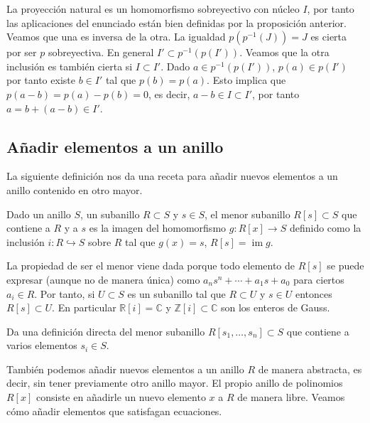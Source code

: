 
La proyección natural es un homomorfismo sobreyectivo con núcleo \(I\),
por tanto las aplicaciones del enunciado están bien definidas por la
proposición anterior. Veamos que una es inversa de la otra. La igualdad
\(p(p^{-1}(J))=J\) es cierta por ser \(p\) sobreyectiva. En general
\(I'\subset p^{-1}(p(I'))\). Veamos que la otra inclusión es también
cierta si \(I\subset I'\). Dado \(a\in p^{-1}(p(I'))\),
\(p(a)\in p(I')\) por tanto existe \(b\in I'\) tal que \(p(b)=p(a)\).
Esto implica que \(p(a-b)=p(a)-p(b)=0\), es decir,
\(a-b\in I\subset I'\), por tanto \(a=b+(a-b)\in I'\). 

\hypertarget{auxf1adir-elementos-a-un-anillo}{%
\subsection{Añadir elementos a un
anillo}\label{auxf1adir-elementos-a-un-anillo}}

La siguiente definición nos da una receta para añadir nuevos elementos a
un anillo contenido en otro mayor.


Dado un anillo \(S\), un subanillo \(R\subset S\) y \(s\in S\), el menor
subanillo \(R[s]\subset S\) que contiene a \(R\) y a \(s\) es la imagen
del homomorfismo \(g\colon R[x]\rightarrow S\) definido como la
inclusión \(i\colon R\hookrightarrow S\) sobre \(R\) tal que \(g(x)=s\),
\(R[s]=\operatorname{im} g\). 


La propiedad de ser el menor viene dada porque todo elemento de \(R[s]\)
se puede expresar (aunque no de manera única) como
\(a_ns^n+\cdots+a_1s+a_0\) para ciertos \(a_i\in R\). Por tanto, si
\(U\subset S\) es un subanillo tal que \(R\subset U\) y \(s\in U\)
entonces \(R[s]\subset U\). En particular \(\mathbb R[i]=\mathbb C\) y
\(\mathbb Z[i]\subset\mathbb C\) son los enteros de Gauss. 


Da una definición directa del menor subanillo
\(R[s_1,\dots,s_n]\subset S\) que contiene a varios elementos
\(s_i\in S\). 

También podemos añadir nuevos elementos a un anillo \(R\) de manera
abstracta, es decir, sin tener previamente otro anillo mayor. El propio
anillo de polinomios \(R[x]\) consiste en añadirle un nuevo elemento
\(x\) a \(R\) de manera libre. Veamos cómo añadir elementos que
satisfagan ecuaciones.

